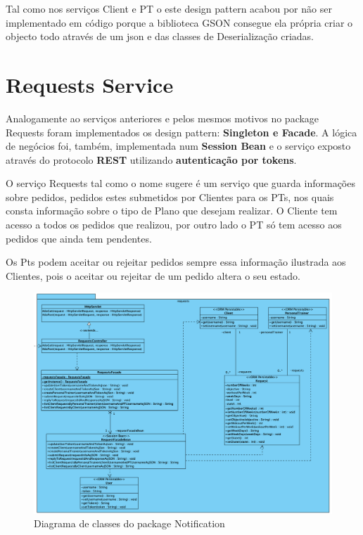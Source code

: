 \hspace{5mm} Tal como nos serviços Client e PT o este design pattern acabou por não ser implementado em código porque a biblioteca GSON consegue ela própria criar o objecto todo através de um json e das classes de Deserialização criadas.

\section{Requests Service}

\hspace{5mm} Analogamente ao serviços anteriores e pelos mesmos motivos no package Requests foram implementados os design pattern: \textbf{Singleton e Facade}. A lógica de negócios foi, também, implementada num \textbf{Session Bean} e o serviço exposto através do protocolo \textbf{REST} utilizando \textbf{autenticação por tokens}.

\hspace{5mm} O serviço Requests tal como o nome sugere é um serviço que guarda informações sobre pedidos, pedidos estes submetidos por Clientes para os PTs, nos quais consta informação sobre o tipo de Plano que desejam realizar. O Cliente tem acesso a todos os pedidos que realizou, por outro lado o PT só tem acesso aos pedidos que ainda tem pendentes.

\hspace{5mm} Os Pts podem aceitar ou rejeitar pedidos sempre essa informação ilustrada aos Clientes, pois o aceitar ou rejeitar de um pedido altera o seu estado.

\begin{figure}[H]
    \centering
    \includegraphics[scale=0.5]{images/arquitetura/requests-package.png}
    \caption{Diagrama de classes do package Notification}
    \label{fig:my_label}
\end{figure}

